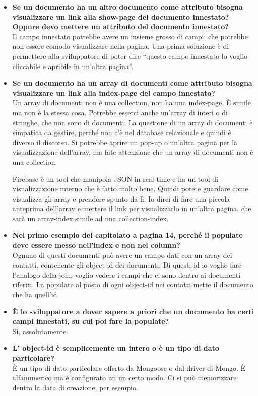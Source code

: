 \begin{itemize}
		\item
		{\bfseries Se un documento ha un altro documento come attributo bisogna visualizzare un link alla show-page del documento innestato? Oppure devo mettere un attributo del documento innestato?} \\
		Il campo innestato potrebbe avere un insieme grosso di campi, che potrebbe non essere comodo visualizzare nella pagina. Una prima soluzione è di permettere allo sviluppatore di poter dire ``questo campo innestato lo voglio cliccabile e apribile in un'altra pagina''.
		
		\item
		{\bfseries Se un documento ha un array di documenti come attributo bisogna visualizzare un link alla index-page del campo innestato?} \\
		Un array di documenti non è una collection, non ha una index-page. È simile ma non è la stessa cosa. Potrebbe esserci anche un'array di interi o di stringhe, che non sono di documenti. La questione di un array di documenti è simpatica da gestire, perché non c'è nel database relazionale e quindi è diverso il discorso. Si potrebbe aprire un pop-up o un'altra pagina per la visualizzazione dell'array, ma fate attenzione che un array di documenti non è una collection.
		
		Firebase è un tool che manipola JSON in real-time e ha un tool di visualizzazione interno che è fatto molto bene. Quindi potete guardare come visualizza gli array e prendere spunto da lì. Io direi di fare una piccola anteprima dell'array e mettere il link per visualizzarlo in un'altra pagina, che sarà un array-index simile ad una collection-index.
		
		\item
		{\bfseries Nel primo esempio del capitolato a pagina 14, perché il populate deve essere messo nell'index e non nel column?} \\
		Ognuno di questi documenti può avere un campo dati con un array dei contatti, contenente gli object-id dei documenti. Di questi id io voglio fare l'analogo della join, voglio vedere i campi che ci sono dentro ai documenti riferiti. La populate al posto di ogni object-id nei contatti mette il documento che ha quell'id.
		
		\item
		{\bfseries È lo sviluppatore a dover sapere a priori che un documento ha certi campi innestati, su cui poi fare la populate?} \\
		Sì, assolutamente.
		
		\item
		{\bfseries L' object-id è semplicemente un intero o è un tipo di dato particolare?} \\
		È un tipo di dato particolare offerto da Mongoose o dal driver di Mongo. È alfanumerico ma è configurato un un certo modo. Ci si può memorizzare dentro la data di creazione, per esempio.
		

\end{itemize}
